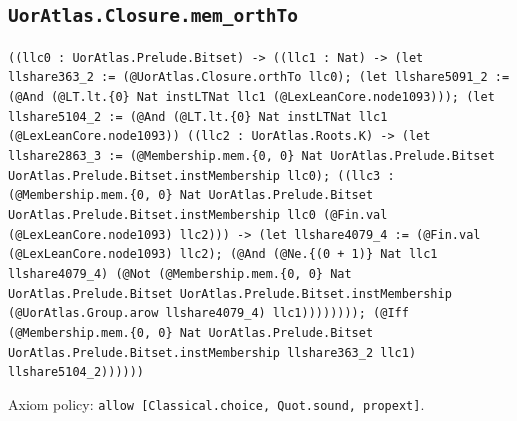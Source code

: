 \documentclass[11pt]{article}
\begin{document}
\subsection*{\texttt{UorAtlas.Closure.mem\_orthTo}}
\noindent\texttt{((llc0 : UorAtlas.Prelude.Bitset) -> ((llc1 : Nat) -> (let llshare363\_2 := (@UorAtlas.Closure.orthTo llc0); (let llshare5091\_2 := (@And (@LT.lt.\{0\} Nat instLTNat llc1 (@LexLeanCore.node1093))); (let llshare5104\_2 := (@And (@LT.lt.\{0\} Nat instLTNat llc1 (@LexLeanCore.node1093)) ((llc2 : UorAtlas.Roots.K) -> (let llshare2863\_3 := (@Membership.mem.\{0, 0\} Nat UorAtlas.Prelude.Bitset UorAtlas.Prelude.Bitset.instMembership llc0); ((llc3 : (@Membership.mem.\{0, 0\} Nat UorAtlas.Prelude.Bitset UorAtlas.Prelude.Bitset.instMembership llc0 (@Fin.val (@LexLeanCore.node1093) llc2))) -> (let llshare4079\_4 := (@Fin.val (@LexLeanCore.node1093) llc2); (@And (@Ne.\{(0 + 1)\} Nat llc1 llshare4079\_4) (@Not (@Membership.mem.\{0, 0\} Nat UorAtlas.Prelude.Bitset UorAtlas.Prelude.Bitset.instMembership (@UorAtlas.Group.arow llshare4079\_4) llc1)))))))); (@Iff (@Membership.mem.\{0, 0\} Nat UorAtlas.Prelude.Bitset UorAtlas.Prelude.Bitset.instMembership llshare363\_2 llc1) llshare5104\_2))))))}\par
\noindent Axiom policy: \texttt{allow [Classical.choice, Quot.sound, propext]}.\par
\end{document}
